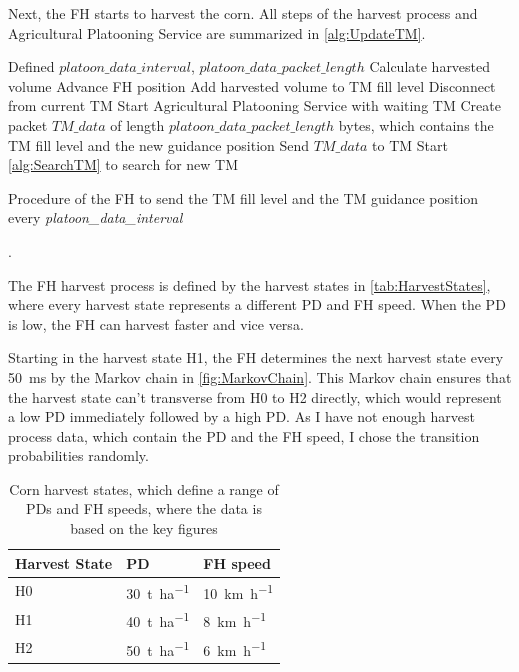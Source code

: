 Next, the \ac{FH} starts to harvest the corn. All steps of the harvest process and Agricultural Platooning Service are summarized in
\autoref{alg:UpdateTM}.

\begin{algorithm}
\begin{algorithmic}[1]
\REQUIRE Defined $platoon\_data\_interval$, $platoon\_data\_packet\_length$
\STATE Calculate harvested volume
\STATE Advance \ac{FH} position
\STATE Add harvested volume to \ac{TM} fill level
    \STATE Disconnect from current \ac{TM}
	\STATE Start Agricultural Platooning Service with waiting \ac{TM}
\ELSE
	\STATE Create packet $TM\_data$ of length $platoon\_data\_packet\_length$ bytes, which contains the \ac{TM} fill level and the new guidance position
	\STATE Send $TM\_data$ to \ac{TM}
		\STATE Start \autoref{alg:SearchTM} to search for new \ac{TM}
	\ENDIF
\ENDIF
\end{algorithmic}
\caption{Procedure of the \acf{FH} to send the \acf{TM} fill level and the \ac{TM} guidance position every
\textit{platoon\_data\_interval}}.
\label{alg:UpdateTM}
\end{algorithm}

The FH harvest process is defined by the harvest states in \autoref{tab:HarvestStates},
where every harvest state represents a different \ac{PD} and \ac{FH} speed.
When the \ac{PD} is low, the \ac{FH} can harvest faster and vice versa.

Starting in the harvest state H1, the \ac{FH} determines the next harvest state every \SI{50}{\milli\second}
by the Markov chain in \autoref{fig:MarkovChain}.
This Markov chain ensures that the harvest state can't transverse from H0 to H2 directly, which would represent
a low \ac{PD} immediately followed by a high \ac{PD}.
As I have not enough harvest process data, which contain the \ac{PD} and the \ac{FH} speed,
I chose the transition probabilities randomly.

\begin{table}[H]
	\centering
	\begin{tabular}{>{\centering}p{2cm}p{4cm}p{4cm}}
		\toprule
		Harvest State & \ac{PD} & \ac{FH} speed\\
		\midrule
		H0 & \SI{30}{\tonne\per\hectare}
        & \SI{10}{\kilo\metre\per\hour} \\
		H1 & \SI{40}{\tonne\per\hectare}
        & \SI{8}{\kilo\metre\per\hour} \\
		H2 & \SI{50}{\tonne\per\hectare}
        & \SI{6}{\kilo\metre\per\hour} \\
		\bottomrule
	\end{tabular}
	\caption{Corn harvest states, which define a range of \acf{PD}s and \acf{FH} speeds, where the data is based on the
	key figures \cite{faustzahlen2018}}
	\label{tab:markov_chain}
\end{table}


